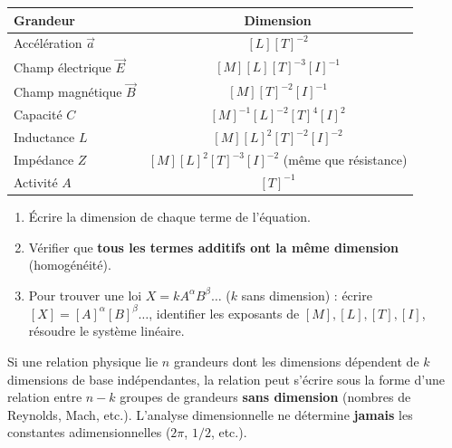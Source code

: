 \documentclass[11pt]{article}
\begin{document}
\begin{aretenir}
\begin{center}
\begin{tabular}{|l|c|}\hline
\rowcolor{popblueL}
\textbf{Grandeur} & \textbf{Dimension} \\ \hline
Accélération $\vec{a}$ & $[L][T]^{-2}$ \\
Champ électrique $\vec{E}$ & $[M][L][T]^{-3}[I]^{-1}$ \\
Champ magnétique $\vec{B}$ & $[M][T]^{-2}[I]^{-1}$ \\
Capacité $C$ & $[M]^{-1}[L]^{-2}[T]^{4}[I]^{2}$ \\
Inductance $L$ & $[M][L]^{2}[T]^{-2}[I]^{-2}$ \\
Impédance $Z$ & $[M][L]^{2}[T]^{-3}[I]^{-2}$ (même que résistance) \\
Activité $A$ & $[T]^{-1}$ \\ \hline
\end{tabular}
\end{center}
\end{aretenir}

\begin{methode}
\begin{enumerate}
    \item Écrire la dimension de chaque terme de l'équation.
    \item Vérifier que \textbf{tous les termes additifs ont la même dimension} (homogénéité).
    \item Pour trouver une loi $X = k A^\alpha B^\beta \dots$ ($k$ sans dimension) : écrire $[X] = [A]^\alpha [B]^\beta \dots$, identifier les exposants de $[M], [L], [T], [I]$, résoudre le système linéaire.
\end{enumerate}
\end{methode}

\begin{propriete}
Si une relation physique lie $n$ grandeurs dont les dimensions dépendent de $k$ dimensions de base indépendantes, la relation peut s'écrire sous la forme d'une relation entre $n-k$ groupes de grandeurs \textbf{sans dimension} (nombres de Reynolds, Mach, etc.). L'analyse dimensionnelle ne détermine \textbf{jamais} les constantes adimensionnelles ($2\pi$, $1/2$, etc.).
\end{propriete}
\end{document}
